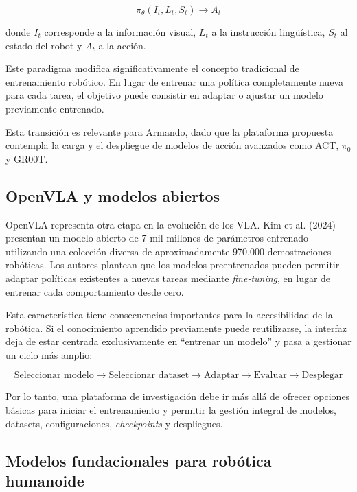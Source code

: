 \documentclass[stu,12pt,floatsintext]{apa7}
\begin{document}
\begin{equation}
\pi_{\theta}(I_t,L_t,S_t) \rightarrow A_t
\end{equation}

donde $I_t$ corresponde a la información visual, $L_t$ a la instrucción lingüística, $S_t$ al estado del robot y $A_t$ a la acción.

Este paradigma modifica significativamente el concepto tradicional de entrenamiento robótico. En lugar de entrenar una política completamente nueva para cada tarea, el objetivo puede consistir en adaptar o ajustar un modelo previamente entrenado.

Esta transición es relevante para Armando, dado que la plataforma propuesta contempla la carga y el despliegue de modelos de acción avanzados como ACT, $\pi_0$ y GR00T.

\subsection{OpenVLA y modelos abiertos}

OpenVLA representa otra etapa en la evolución de los VLA. Kim et al. (2024) presentan un modelo abierto de 7 mil millones de parámetros entrenado utilizando una colección diversa de aproximadamente 970.000 demostraciones robóticas. Los autores plantean que los modelos preentrenados pueden permitir adaptar políticas existentes a nuevas tareas mediante \textit{fine-tuning}, en lugar de entrenar cada comportamiento desde cero.

Esta característica tiene consecuencias importantes para la accesibilidad de la robótica. Si el conocimiento aprendido previamente puede reutilizarse, la interfaz deja de estar centrada exclusivamente en ``entrenar un modelo'' y pasa a gestionar un ciclo más amplio:

\begin{equation}
\text{Seleccionar modelo}
\rightarrow
\text{Seleccionar dataset}
\rightarrow
\text{Adaptar}
\rightarrow
\text{Evaluar}
\rightarrow
\text{Desplegar}
\end{equation}

Por lo tanto, una plataforma de investigación debe ir más allá de ofrecer opciones básicas para iniciar el entrenamiento y permitir la gestión integral de modelos, datasets, configuraciones, \textit{checkpoints} y despliegues.

\subsection{Modelos fundacionales para robótica humanoide}
\end{document}
